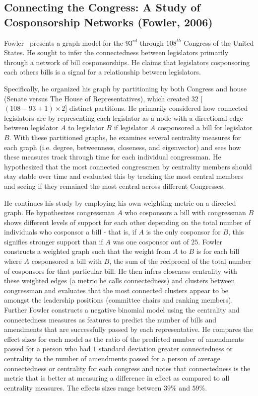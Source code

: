 \subsection{Connecting the Congress: A Study of Cosponsorship Networks (Fowler, 2006)}

Fowler~\cite{Fowler} presents a graph model for the $93^{rd}$ through $108^{th}$
Congress of the United  States. He sought to infer the connectedness between
legislators primarily  through a network of bill cosponsorships. He claims that
legislators  cosponsoring each others bills is a signal for a relationship
between legislators.

Specifically, he organized his graph by partitioning by both Congress and house 
(Senate versus The House of Representatives), which created $32$ 
[$(108 - 93 + 1) \times 2$] distinct partitions. He primarily considered how 
connected legislators are by representing each legislator as a node with a 
directional edge between legislator $A$ to legislator $B$ if legislator $A$ 
cosponsored a bill for legislator $B$. With these partitioned graphs, he 
examines several centrality measures for each graph (i.e. degree, betweenness, 
closeness, and eigenvector) and sees how these measures track through time for 
each individual congressman. He hypothesized that the most connected 
congressmen by centrality members should stay stable over time and evaluated 
this by tracking the most central members and seeing if they remained the 
most central across different Congresses.

He continues his study by employing his own weighting metric on a directed 
graph. He hypothesizes congressman $A$ who cosponsors a bill with congressman 
$B$ shows different levels of support for each other depending on the total 
number of individuals who cosponsor a bill - that is, if $A$ is the only 
cosponsor for $B$, this signifies stronger support than if $A$ was one 
cosponsor out of $25$. Fowler constructs a weighted graph such that the weight 
from $A$ to $B$ is for each bill where $A$ cosponsored a bill with $B$, the 
sum of the reciprocal of the total number of cosponsors for that particular 
bill. He then infers closeness centrality with these weighted edges (a metric 
he calls connectedness) and clusters between congressman and evaluates that the 
most connected clusters appear to be amongst the leadership positions 
(committee chairs and ranking members). Further Fowler constructs a negative 
binomial model using the centrality and connectedness measures as features to 
predict the number of bills and amendments that are successfully passed by each 
representative. He compares the effect sizes for each model as the ratio of the 
predicted number of amendments passed for a person who had $1$ standard 
deviation greater connectedness or centrality to the  number of amendments 
passed for a person of average connectedness or centrality for each congress 
and notes that connectedness is the metric that is better at measuring a 
difference in effect as compared to all centrality measures. The effects sizes 
range between $39\%$ and $59\%$.

